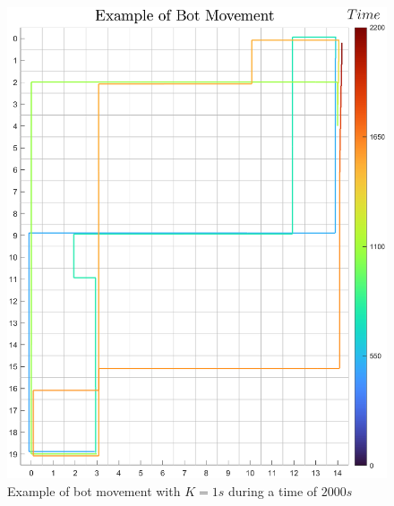 \documentclass[10pt,a4paper]{article}
\begin{document}
				\begin{figure}[H]
					\centering
					\includegraphics[scale = 0.55]{Images/BotMovement}
					\caption{Example of bot movement with $K=1s$ during a time of $2000s$}
				\end{figure}
\end{document}
